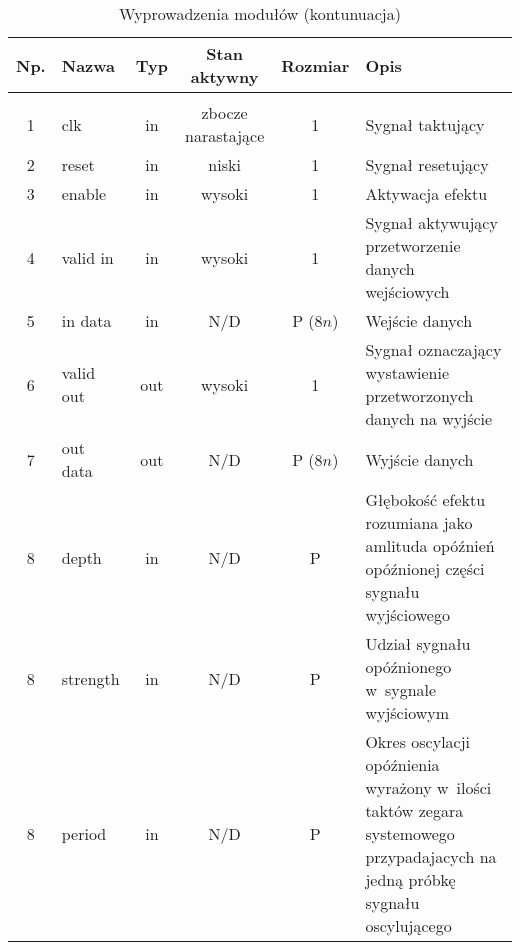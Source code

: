 \setcounter{table}{0}
\begin{table}[t]
\small
\centering
\begin{tabular}{|c|l|c|c|c|m{4.5cm}|}
\hline
\rowcolor[HTML]{C0C0C0}
\textbf{Np.} & \textbf{Nazwa} & \textbf{Typ} & \textbf{Stan aktywny} & \textbf{Rozmiar} & \textbf{Opis} \\ \hline
\rowcolor[HTML]{34CDF9}\multicolumn{6}{|l|}{Efekt \textit{flanger}} \\ \hline
1            & clk       & in           & zbocze narastające    & 1                 & Sygnał taktujący                                                                                                           \\ \hline
2            & reset     & in           & niski                 & 1                 & Sygnał resetujący                                                                                                          \\ \hline
3            & enable    & in           & wysoki                & 1                 & Aktywacja efektu                                                                                                           \\ \hline
4            & valid in  & in           & wysoki                & 1                 & Sygnał aktywujący przetworzenie danych wejściowych                                                                         \\ \hline
5            & in data   & in           & N/D                   & P ($8n$)          & Wejście danych                                                                                                             \\ \hline
6            & valid out & out          & wysoki                & 1                 & Sygnał oznaczający wystawienie przetworzonych danych na wyjście                                                            \\ \hline
7            & out data  & out          & N/D                   & P ($8n$)          & Wyjście danych                                                                                                             \\ \hline
8            & depth     & in           & N/D                   & P                 & Głębokość efektu rozumiana jako amlituda opóźnień opóźnionej części sygnału wyjściowego                                    \\ \hline
8            & strength  & in           & N/D                   & P                 & Udział sygnału opóźnionego w~sygnale wyjściowym                                                                            \\ \hline
8            & period    & in           & N/D                   & P                 & Okres oscylacji opóźnienia wyrażony w~ilości taktów zegara systemowego przypadajacych na jedną próbkę sygnału oscylującego \\ \hline
\end{tabular}
\caption{Wyprowadzenia modułów (kontunuacja)}
\end{table}

